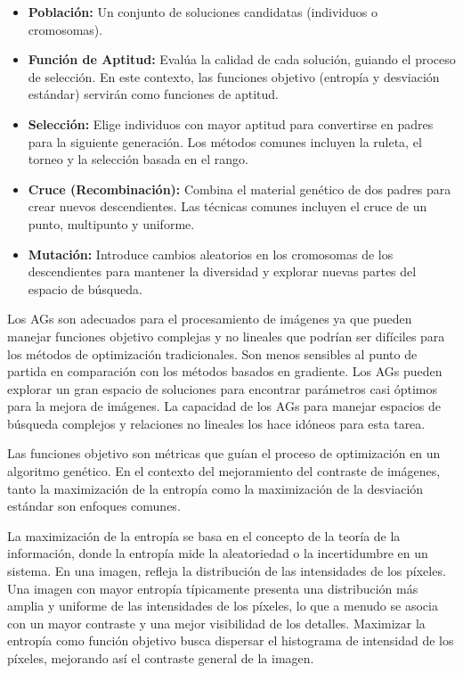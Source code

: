 \begin{itemize}
\item \textbf{Población:} Un conjunto de soluciones candidatas (individuos o cromosomas).

\item \textbf{Función de Aptitud:} Evalúa la calidad de cada solución, guiando el proceso de selección. En este contexto, las funciones objetivo (entropía y desviación estándar) servirán como funciones de aptitud.

\item \textbf{Selección:} Elige individuos con mayor aptitud para convertirse en padres para la siguiente generación. Los métodos comunes incluyen la ruleta, el torneo y la selección basada en el rango.

\item \textbf{Cruce (Recombinación):} Combina el material genético de dos padres para crear nuevos descendientes. Las técnicas comunes incluyen el cruce de un punto, multipunto y uniforme.

\item \textbf{Mutación:} Introduce cambios aleatorios en los cromosomas de los descendientes para mantener la diversidad y explorar nuevas partes del espacio de búsqueda.
\end{itemize}

Los AGs son adecuados para el procesamiento de imágenes ya que pueden manejar funciones objetivo complejas y no lineales que podrían ser difíciles para los métodos de optimización tradicionales. Son menos sensibles al punto de partida en comparación con los métodos basados en gradiente. Los AGs pueden explorar un gran espacio de soluciones para encontrar parámetros casi óptimos para la mejora de imágenes. La capacidad de los AGs para manejar espacios de búsqueda complejos y relaciones no lineales los hace idóneos para esta tarea.

Las funciones objetivo son métricas que guían el proceso de optimización en un algoritmo genético. En el contexto del mejoramiento del contraste de imágenes, tanto la maximización de la entropía como la maximización de la desviación estándar son enfoques comunes.

La maximización de la entropía se basa en el concepto de la teoría de la información, donde la entropía mide la aleatoriedad o la incertidumbre en un sistema. En una imagen, refleja la distribución de las intensidades de los píxeles. Una imagen con mayor entropía típicamente presenta una distribución más amplia y uniforme de las intensidades de los píxeles, lo que a menudo se asocia con un mayor contraste y una mejor visibilidad de los detalles. Maximizar la entropía como función objetivo busca dispersar el histograma de intensidad de los píxeles, mejorando así el contraste general de la imagen.

